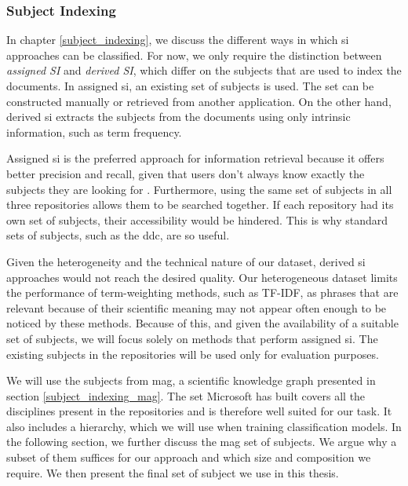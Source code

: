 \subsubsection{Subject Indexing} \label{problem_scope_asi}

In chapter \ref{subject_indexing}, we discuss the different ways in which \acrshort{si} approaches can be classified. For now, we only require the distinction between \textit{assigned SI} and \textit{derived SI}, which differ on the subjects that are used to index the documents. In assigned \acrshort{si}, an existing set of subjects is used. The set can be constructed manually or retrieved from another application. On the other hand, derived \acrshort{si} extracts the subjects from the documents using only intrinsic information, such as term frequency.

Assigned \acrshort{si} is the preferred approach for information retrieval because it offers better precision and recall, given that users don't always know exactly the subjects they are looking for \cite{golub2019automatic}. Furthermore, using the same set of subjects in all three repositories allows them to be searched together. If each repository had its own set of subjects, their accessibility would be hindered. This is why standard sets of subjects, such as the \acrfull{ddc}, are so useful.

Given the heterogeneity and the technical nature of our dataset, derived \acrshort{si} approaches would not reach the desired quality. Our heterogeneous dataset limits the performance of term-weighting methods, such as TF-IDF, as phrases that are relevant because of their scientific meaning may not appear often enough to be noticed by these methods. Because of this, and given the availability of a suitable set of subjects, we will focus solely on methods that perform assigned \acrshort{si}. The existing subjects in the repositories will be used only for evaluation purposes.

We will use the subjects from \acrfull{mag}, a scientific knowledge graph presented in section \ref{subject_indexing_mag}. The set Microsoft has built covers all the disciplines present in the repositories and is therefore well suited for our task. It also includes a hierarchy, which we will use when training classification models. In the following section, we further discuss the \acrshort{mag} set of subjects. We argue why a subset of them suffices for our approach and which size and composition we require. We then present the final set of subject we use in this thesis.